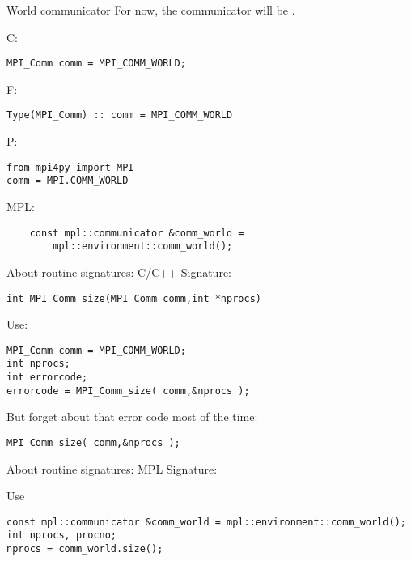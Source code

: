 \begin{numberedframe}{World communicator}
  \label{sl:mpi-comm-world}
  For now, the communicator will be .

  C:
  \lstset{language=C}
\begin{lstlisting}
MPI_Comm comm = MPI_COMM_WORLD;
\end{lstlisting}

  F:
  \lstset{language=Fortran}
\begin{lstlisting}
Type(MPI_Comm) :: comm = MPI_COMM_WORLD
\end{lstlisting}

  P:
  \lstset{language=Python}
\begin{lstlisting}
from mpi4py import MPI
comm = MPI.COMM_WORLD
\end{lstlisting}

  MPL:
  \lstset{language=C++}
\begin{lstlisting}
    const mpl::communicator &comm_world =
        mpl::environment::comm_world();
\end{lstlisting}
\end{numberedframe}


\begin{numberedframe}{About routine signatures: C/C++}
  \label{sec:protos}
Signature:
\lstset{language=C}
\begin{lstlisting}
int MPI_Comm_size(MPI_Comm comm,int *nprocs)
\end{lstlisting}
Use:
\lstset{language=C}
\begin{lstlisting}
MPI_Comm comm = MPI_COMM_WORLD;
int nprocs;
int errorcode;
errorcode = MPI_Comm_size( comm,&nprocs );
\end{lstlisting}
But forget about that error code most of the time:
\begin{lstlisting}
MPI_Comm_size( comm,&nprocs );
\end{lstlisting}
\end{numberedframe}

\begin{mpl}
  \addtocounter{slidecount}{-1}
\begin{numberedframe}{About routine signatures: MPL}
  Signature:
  
  Use
\begin{lstlisting}
const mpl::communicator &comm_world = mpl::environment::comm_world();
int nprocs, procno;
nprocs = comm_world.size();
\end{lstlisting}
\end{numberedframe}
\end{mpl}

